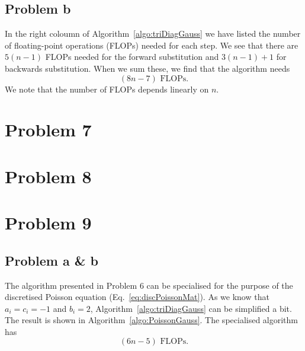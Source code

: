 \documentclass[english,notitlepage,aps,pra,10pt]{revtex4-2}
\begin{document}
\subsection*{Problem b}

In the right coloumn of Algorithm~\ref{algo:triDiagGauss} we have listed the number of floating-point operations (FLOPs) needed for each step. We see that there are $5(n-1)$ FLOPs needed for the forward substitution and $3(n-1)+1$ for backwards substitution. When we sum these, we find that the algorithm needs
\begin{equation}
    (8n-7) \textrm{ FLOPs}.
\end{equation} 
We note that the number of FLOPs depends linearly on $n$.


\section*{Problem 7}



\section*{Problem 8}


\section*{Problem 9}

\subsection*{Problem a \& b}

The algorithm presented in Problem 6 can be specialised for the purpose of the discretised Poisson equation (Eq.~\ref{eq:discPoissonMat}). As we know that $a_i = c_i = -1$ and $b_i = 2$, Algorithm~\ref{algo:triDiagGauss} can be simplified a bit. The result is shown in Algorithm~\ref{algo:PoissonGauss}. The specialised algorithm has
\begin{equation}
    (6n-5) \textrm{ FLOPs}.
\end{equation}
\end{document}
